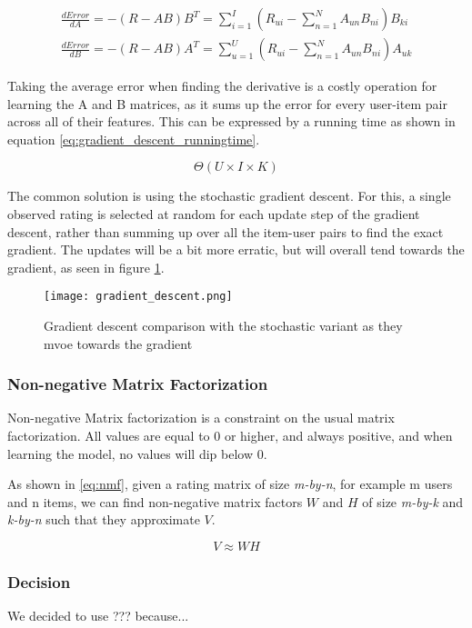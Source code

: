 \begin{equation}\label{eq:derivative_gradient}
	\begin{split}
	\frac{dError}{dA}=-(R-AB)B^T = \sum_{i=1}^{I}(R_{ui} - \sum_{n=1}^{N} A_{un}B_{ni})B_{ki}
	\\
	\frac{dError}{dB}=-(R-AB)A^T = \sum_{u=1}^{U}(R_{ui} - \sum_{n=1}^{N} A_{un}B_{ni})A_{uk}
	\end{split}
\end{equation}

Taking the average error when finding the derivative is a costly operation for learning the A and B matrices, as it sums up the error for every user-item pair across all of their features. This can be expressed by a running time as shown in equation \ref{eq:gradient_descent_runningtime}.

\begin{equation}\label{eq:gradient_descent_runningtime}
	\Theta(U\times I \times K)
\end{equation}

The common solution is using the stochastic gradient descent. For this, a single observed rating is selected at random for each update step of the gradient descent, rather than summing up over all the item-user pairs to find the exact gradient. The updates will be a bit more erratic, but will overall tend towards the gradient, as seen in figure \ref{fig:gradient_descent}.

\begin{figure}\label{fig:gradient_descent}
	\centering
	\texttt{[image: gradient\_descent.png]}
	\caption{Gradient descent comparison with the stochastic variant as they mvoe towards the gradient}
\end{figure}



\subsubsection{Non-negative Matrix Factorization}

Non-negative Matrix factorization is a constraint on the usual matrix factorization. All values are equal to 0 or higher, and always positive, and when learning the model, no values will dip below 0.

As shown in \ref{eq:nmf}, given a rating matrix of size \textit{m-by-n}, for example m users and n items, we can find non-negative matrix factors $W$ and $H$ of size \textit{m-by-k} and \textit{k-by-n} such that they approximate $V$.

\begin{equation} \label{eq:nmf}
	V \approx W H
\end{equation}

\subsubsection{Decision}\label{sec:decision} %
We decided to use ??? because...

